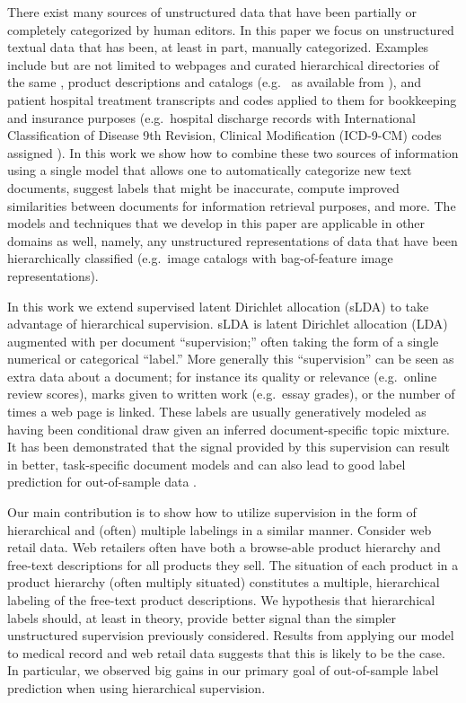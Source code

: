 There exist many sources of unstructured data that have been partially or completely categorized by human editors.  In this paper we focus on unstructured textual data that has been, at least in part, manually categorized.  Examples include but are not limited to webpages and curated hierarchical directories of the same \citep{DMOZ}, product descriptions and catalogs (e.g.~\citep{AMAZON} as available from \citep{SNAP}), and patient hospital treatment transcripts and  codes applied to them for bookkeeping and insurance purposes (e.g.~hospital discharge records with International Classification of Disease 9th Revision,
Clinical Modification (ICD-9-CM) codes assigned \cite{}).  In this work we show how to combine these two sources of information using a single model that allows one to automatically categorize new text documents, suggest labels that might be inaccurate, compute improved similarities between documents for information retrieval purposes, and more.  The models and techniques that we develop in this paper are applicable in other domains as well, namely, any unstructured representations of data that have been hierarchically classified (e.g.~image catalogs with bag-of-feature image representations). 

In this work we extend supervised latent Dirichlet allocation (sLDA) \cite{BleiMcAuliffe2008} to take advantage of hierarchical supervision.  sLDA is latent Dirichlet allocation (LDA) \cite{Blei2003} augmented with per document ``supervision;''  often taking the form of a single numerical or categorical ``label.''  More generally this ``supervision'' can be seen as extra data  about a document;  for instance its quality or relevance (e.g.~online review scores), marks given to written work (e.g.~essay grades), or the number of times a web page is linked.  These labels are usually generatively modeled as having been conditional draw given an inferred document-specific topic mixture.  It has been demonstrated that the signal provided by this supervision can result in better, task-specific document models and can also lead to good label prediction for out-of-sample data \cite{}.

Our main contribution is to show how to utilize supervision in the form of  hierarchical and (often) multiple labelings in a similar manner.   Consider web retail data.  Web retailers often have both a browse-able product hierarchy and free-text descriptions for all products they sell.   The situation of each product in a product hierarchy (often multiply situated) constitutes a multiple, hierarchical labeling of the free-text product descriptions.  We hypothesis that hierarchical labels should, at least in theory, provide better signal than the simpler unstructured supervision previously considered.  Results from applying our model to medical record and web retail data suggests that this is likely to be the case.  In particular, we observed big gains in our primary goal of out-of-sample label prediction when using hierarchical supervision. 

